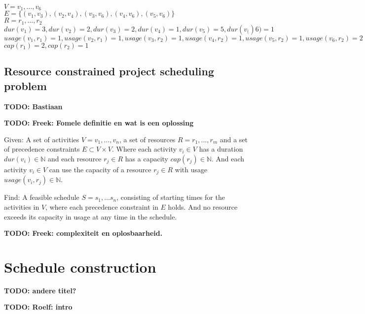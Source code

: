 \documentclass{article}
\newcommand{\TODO}[1]{{\color{red}\textbf{TODO: #1}}}
\newcommand{\capa}[1]{\ensuremath{cap(r_{#1})}} %
\newcommand{\dur}[1]{\ensuremath{dur(v_{#1})}} %
\newcommand{\usage}[2]{\ensuremath{usage(v_{#1}, r_{#2})}} %
\newenvironment{definition}[1][Definition]{\begin{trivlist}
\item[\hskip \labelsep {\bfseries #1}]}{\end{trivlist}}
\begin{document}
$V = v_1, \ldots, v_6$\\
$E = \{(v_1, v_3), (v_2, v_4), (v_3, v_6), (v_4, v_6), (v_5, v_6)\}$\\
$R = r_1, \ldots, r_2$\\
$\dur{1} = 3, \dur{2} = 2, \dur{3} = 2, \dur{4} = 1, \dur{5} = 5, \dur(6) = 1$\\
$\usage{1}{1} = 1, \usage{2}{1} = 1, \usage{3}{2} = 1, \usage{4}{2} = 1, \usage{5}{2} = 1, \usage{6}{2} = 2$\\
$\capa{1} = 2, \capa{2} = 1$


\subsection{Resource constrained project scheduling problem}

\TODO{Bastiaan}


\TODO{Freek: Fomele definitie en wat is een oplossing}

\begin{definition}
Given:
A set of activities $V = v_1, \ldots, v_n$, a set of resources $R = r_1, \ldots, r_m$ and a set of precedence constraints $E \subset V \times V$.
Where each activity $v_i \in V$ has a duration $\dur{i} \in \mathbb{N}$ and each resource $r_j \in R$ has a capacity $\capa{j} \in \mathbb{N}$. 
And each activity $v_i \in V$ can use the capacity of a resource $r_j \in R$ with usage $\usage{i}{j} \in \mathbb{N}$.

Find:
A feasible schedule $S = s_1, \ldots s_n$, consisting of starting times for the activities in $V$, where each precedence constraint in $E$ holds.
And no resource exceeds its capacity in usage at any time in the schedule.
\end{definition}


\TODO{Freek: complexiteit en oplosbaarheid.}


\newpage


\section{Schedule construction} \TODO{andere titel?}

\TODO{Roelf: intro}
\end{document}
